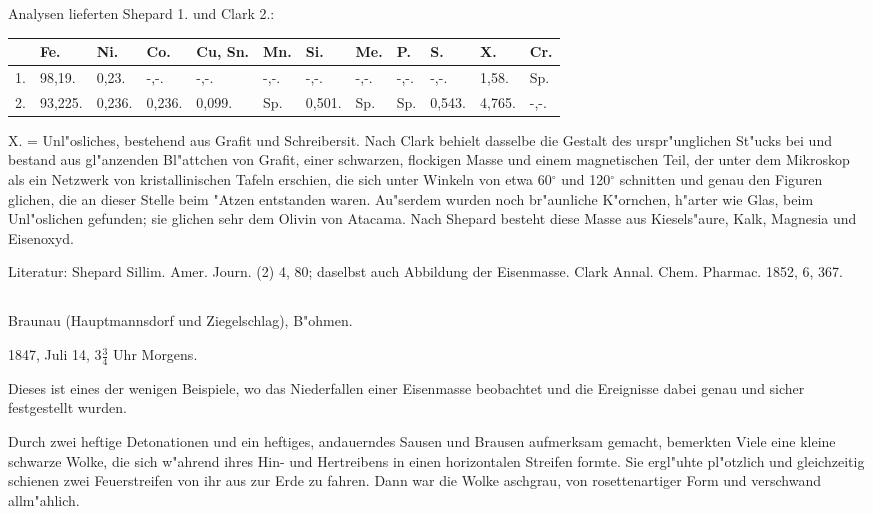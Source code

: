 \documentclass[a4paper, 11pt, oneside]{article}
\begin{document}
Analysen lieferten Shepard 1. und Clark 2.:
\begin{table}[H]
    \centering\swabfamily\Large
    \normalsize
    \begin{tabular}{p{3mm} p{6mm} p{6mm} p{6mm} p{10mm} p{6mm} p{6mm} p{6mm} p{6mm} p{6mm} p{6mm} p{6mm}}
         & Fe. & Ni. & Co. & Cu, Sn. & Mn. & Si. & Me. & P. & S. & X. & Cr. \\ \hline
        1. & 98,19. & 0,23. & -,-. & -,-. & -,-. & -,-. & -,-. & -,-. & -,-. & 1,58. & Sp. \\
        2. & 93,225. & 0,236. & 0,236. & 0,099. & Sp. & 0,501. & Sp. & Sp. & 0,543. & 4,765. & -,-.  \\
    \end{tabular}
\end{table}

X. = Unl"osliches, bestehend aus Grafit und Schreibersit. Nach Clark behielt dasselbe die Gestalt des urspr"unglichen St"ucks bei und bestand aus gl"anzenden Bl"attchen von Grafit, einer schwarzen, flockigen Masse und einem magnetischen Teil, der unter dem Mikroskop als ein Netzwerk von kristallinischen Tafeln erschien, die sich unter Winkeln von etwa 60$^\circ$ und 120$^\circ$ schnitten und genau den Figuren glichen, die an dieser Stelle beim "Atzen entstanden waren. Au"serdem wurden noch br"aunliche K"ornchen, h"arter wie Glas, beim Unl"oslichen gefunden; sie glichen sehr dem Olivin von Atacama. Nach Shepard besteht diese Masse aus Kiesels"aure, Kalk, Magnesia und Eisenoxyd.

\normalsize
Literatur: Shepard Sillim. Amer. Journ. (2) 4, 80; daselbst auch Abbildung der Eisenmasse. Clark Annal. Chem. Pharmac. 1852, 6, 367.

\subsection{}
\LARGE
\paragraph{}
Braunau (Hauptmannsdorf und Ziegelschlag), B"ohmen.

1847, Juli 14, $\mathfrak{3\frac{3}{4}}$ Uhr Morgens.

Dieses ist eines der wenigen Beispiele, wo das Niederfallen einer Eisenmasse beobachtet und die Ereignisse dabei genau und sicher festgestellt wurden.

Durch zwei heftige Detonationen und ein heftiges, andauerndes Sausen und Brausen aufmerksam gemacht, bemerkten Viele eine kleine schwarze Wolke, die sich w"ahrend ihres Hin- und Hertreibens in einen horizontalen Streifen formte. Sie ergl"uhte pl"otzlich und gleichzeitig schienen zwei Feuerstreifen von ihr aus zur Erde zu fahren. Dann war die Wolke aschgrau, von rosettenartiger Form und verschwand allm"ahlich.
\end{document}
